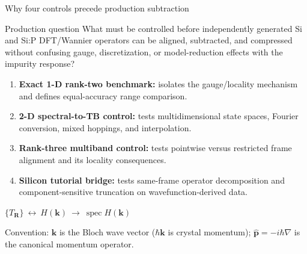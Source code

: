 \documentclass[aspectratio=169,10pt]{beamer}
\begin{document}
\begin{frame}{Why four controls precede production subtraction}
  \begin{block}{Production question}
    What must be controlled before independently generated Si and Si:P DFT/Wannier
    operators can be aligned, subtracted, and compressed without confusing gauge,
    discretization, or model-reduction effects with the impurity response?
  \end{block}

  \begin{enumerate}
    \item \textbf{Exact 1-D rank-two benchmark:} isolates the gauge/locality mechanism
          and defines equal-accuracy range comparison.
    \item \textbf{2-D spectral-to-TB control:} tests multidimensional state spaces,
          Fourier conversion, mixed hoppings, and interpolation.
    \item \textbf{Rank-three multiband control:} tests pointwise versus restricted
          frame alignment and its locality consequences.
    \item \textbf{Silicon tutorial bridge:} tests same-frame operator decomposition and
          component-sensitive truncation on wavefunction-derived data.
  \end{enumerate}

  \vspace{0.4em}
  \centering
  $\{T_{\mathbf R}\}\ \longleftrightarrow\ H(\mathbf k)\
  \longrightarrow\ \operatorname{spec}H(\mathbf k)$

  \vspace{0.35em}
  \footnotesize
  Convention: $\mathbf k$ is the Bloch wave vector ($\hbar\mathbf k$ is crystal
  momentum); $\hat{\mathbf p}=-i\hbar\nabla$ is the canonical momentum operator.
\end{frame}
\end{document}
